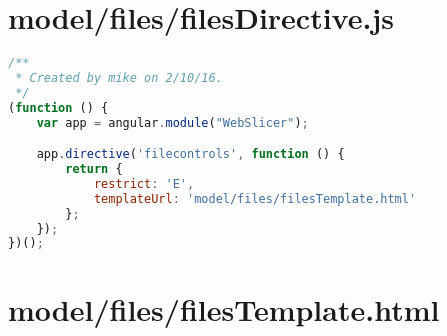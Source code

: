 \section{model/files/filesDirective.js}
\begin{lstlisting}[language=JavaScript, label={lst:filesDirective}, caption=This directive links together the template and controller for ease of use when integrating into the index.html page.]
/**
 * Created by mike on 2/10/16.
 */
(function () {
    var app = angular.module("WebSlicer");

    app.directive('filecontrols', function () {
        return {
            restrict: 'E',
            templateUrl: 'model/files/filesTemplate.html'
        };
    });
})();
\end{lstlisting}

\section{model/files/filesTemplate.html}
